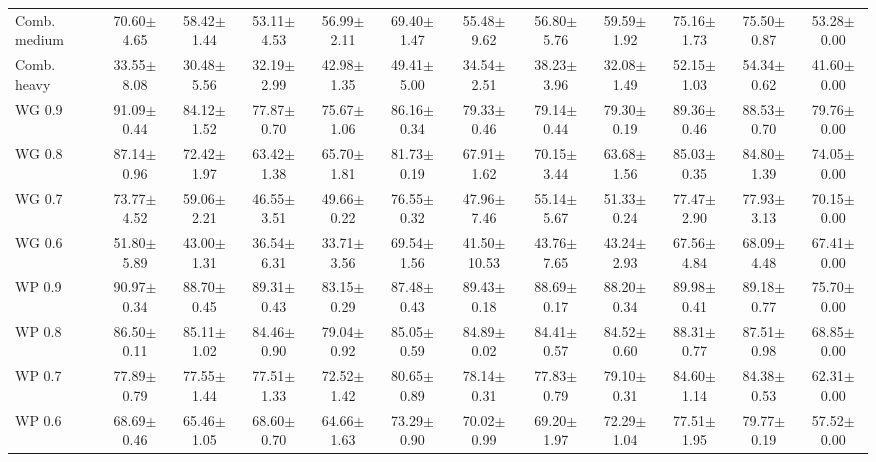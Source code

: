\begin{table}[!t]
{\begin{tabular}{lccccccccccc}
Comb. medium & 70.60$\pm$4.65 & 58.42$\pm$1.44 & 53.11$\pm$4.53 & 56.99$\pm$2.11 & 69.40$\pm$1.47 & 55.48$\pm$9.62 & 56.80$\pm$5.76 & 59.59$\pm$1.92 & 75.16$\pm$1.73 & 75.50$\pm$0.87 & 53.28$\pm$0.00 \\
Comb. heavy & 33.55$\pm$8.08 & 30.48$\pm$5.56 & 32.19$\pm$2.99 & 42.98$\pm$1.35 & 49.41$\pm$5.00 & 34.54$\pm$2.51 & 38.23$\pm$3.96 & 32.08$\pm$1.49 & 52.15$\pm$1.03 & 54.34$\pm$0.62 & 41.60$\pm$0.00 \\
WG 0.9 & 91.09$\pm$0.44 & 84.12$\pm$1.52 & 77.87$\pm$0.70 & 75.67$\pm$1.06 & 86.16$\pm$0.34 & 79.33$\pm$0.46 & 79.14$\pm$0.44 & 79.30$\pm$0.19 & 89.36$\pm$0.46 & 88.53$\pm$0.70 & 79.76$\pm$0.00 \\
WG 0.8 & 87.14$\pm$0.96 & 72.42$\pm$1.97 & 63.42$\pm$1.38 & 65.70$\pm$1.81 & 81.73$\pm$0.19 & 67.91$\pm$1.62 & 70.15$\pm$3.44 & 63.68$\pm$1.56 & 85.03$\pm$0.35 & 84.80$\pm$1.39 & 74.05$\pm$0.00 \\
WG 0.7 & 73.77$\pm$4.52 & 59.06$\pm$2.21 & 46.55$\pm$3.51 & 49.66$\pm$0.22 & 76.55$\pm$0.32 & 47.96$\pm$7.46 & 55.14$\pm$5.67 & 51.33$\pm$0.24 & 77.47$\pm$2.90 & 77.93$\pm$3.13 & 70.15$\pm$0.00 \\
WG 0.6 & 51.80$\pm$5.89 & 43.00$\pm$1.31 & 36.54$\pm$6.31 & 33.71$\pm$3.56 & 69.54$\pm$1.56 & 41.50$\pm$10.53 & 43.76$\pm$7.65 & 43.24$\pm$2.93 & 67.56$\pm$4.84 & 68.09$\pm$4.48 & 67.41$\pm$0.00 \\
WP 0.9 & 90.97$\pm$0.34 & 88.70$\pm$0.45 & 89.31$\pm$0.43 & 83.15$\pm$0.29 & 87.48$\pm$0.43 & 89.43$\pm$0.18 & 88.69$\pm$0.17 & 88.20$\pm$0.34 & 89.98$\pm$0.41 & 89.18$\pm$0.77 & 75.70$\pm$0.00 \\
WP 0.8 & 86.50$\pm$0.11 & 85.11$\pm$1.02 & 84.46$\pm$0.90 & 79.04$\pm$0.92 & 85.05$\pm$0.59 & 84.89$\pm$0.02 & 84.41$\pm$0.57 & 84.52$\pm$0.60 & 88.31$\pm$0.77 & 87.51$\pm$0.98 & 68.85$\pm$0.00 \\
WP 0.7 & 77.89$\pm$0.79 & 77.55$\pm$1.44 & 77.51$\pm$1.33 & 72.52$\pm$1.42 & 80.65$\pm$0.89 & 78.14$\pm$0.31 & 77.83$\pm$0.79 & 79.10$\pm$0.31 & 84.60$\pm$1.14 & 84.38$\pm$0.53 & 62.31$\pm$0.00 \\
WP 0.6 & 68.69$\pm$0.46 & 65.46$\pm$1.05 & 68.60$\pm$0.70 & 64.66$\pm$1.63 & 73.29$\pm$0.90 & 70.02$\pm$0.99 & 69.20$\pm$1.97 & 72.29$\pm$1.04 & 77.51$\pm$1.95 & 79.77$\pm$0.19 & 57.52$\pm$0.00 \\
\hline
\end{tabular}}
\end{table}
